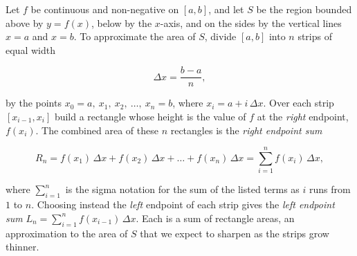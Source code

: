 \documentclass[a4paper,12pt,oneside]{memoir}
\begin{document}
Let \(f\) be continuous and non-negative on \([a, b]\), and let \(S\) be the region bounded above by \(y = f(x)\), below by the \(x\)-axis, and on the sides by the vertical lines \(x = a\) and \(x = b\). To approximate the area of \(S\), divide \([a, b]\) into \(n\) strips of equal width

\[ \Delta x = \frac{b - a}{n}, \]

by the points \(x_{0} = a,\ x_{1},\ x_{2},\ \dots,\ x_{n} = b\), where \(x_{i} = a + i\,\Delta x\). Over each strip \([x_{i-1}, x_{i}]\) build a rectangle whose height is the value of \(f\) at the \emph{right} endpoint, \(f(x_{i})\). The combined area of these \(n\) rectangles is the \emph{right endpoint sum}

\[ R_{n} = f(x_{1})\,\Delta x + f(x_{2})\,\Delta x + \dots + f(x_{n})\,\Delta x = \sum_{i=1}^{n} f(x_{i})\,\Delta x, \]

where \(\sum_{i=1}^{n}\) is the sigma notation for the sum of the listed terms as \(i\) runs from \(1\) to \(n\). Choosing instead the \emph{left} endpoint of each strip gives the \emph{left endpoint sum} \(L_{n} = \sum_{i=1}^{n} f(x_{i-1})\,\Delta x\). Each is a sum of rectangle areas, an approximation to the area of \(S\) that we expect to sharpen as the strips grow thinner.
\end{document}
